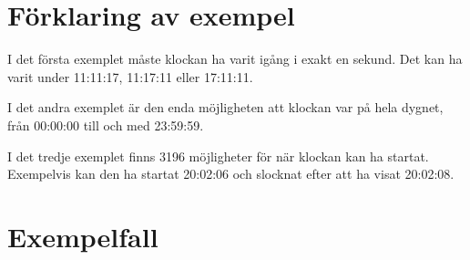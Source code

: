 \section*{Förklaring av exempel}
I det första exemplet måste klockan ha varit igång i exakt en sekund. Det kan ha varit under 11:11:17, 11:17:11 eller 17:11:11.

I det andra exemplet är den enda möjligheten att klockan var på hela dygnet, från 00:00:00 till och med 23:59:59.

I det tredje exemplet finns 3196 möjligheter för när klockan kan ha startat. Exempelvis kan den ha startat 20:02:06 och slocknat efter att ha visat 20:02:08.

\section*{Exempelfall}
